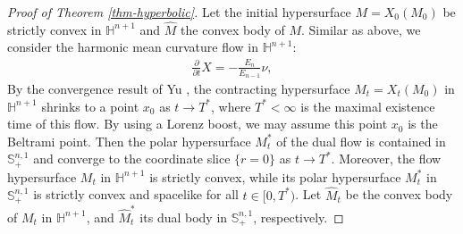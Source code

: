 \documentclass[11pt,reqno]{amsart}
\theoremstyle{definition}
\theoremstyle{remark}
\numberwithin{equation}{section}
\renewcommand{\(}{\left(}
\renewcommand{\)}{\right)}
\renewcommand{\~}{\tilde}
\renewcommand{\-}{\overline}
\newcommand{\ra}{\rightarrow}
\begin{document}
\begin{proof}[Proof of Theorem \ref{thm-hyperbolic}]
    Let the initial hypersurface $M=X_0(M_0)$ be strictly convex in $\mathbb H^{n+1}$ and $\hat{M}$ the convex body of $M$. Similar as above, we consider the harmonic mean curvature flow in $\mathbb H^{n+1}$:
    \begin{align*}
    \frac{\partial}{\partial t} X=-\frac{E_{n}}{E_{n-1}}\nu,
    \end{align*}
    By the convergence result of Yu \cite[Theorem 1.2]{Yu2016}, the contracting hypersurface $M_t=X_t(M_0)$ in $\mathbb H^{n+1}$ shrinks to a point $x_0$ as $t\ra T^\ast$, where $T^\ast<\infty$ is the maximal existence time of this flow. By using a Lorenz boost, we may assume this point $x_0$ is the Beltrami point. Then the polar hypersurface $M_t^\ast$ of the dual flow is contained in $\mathbb S^{n,1}_{+}$ and converge to the coordinate slice $\{r=0\}$ as $t\ra T^\ast$. Moreover, the flow hypersurface $M_t$ in $\mathbb H^{n+1}$ is strictly convex, while its polar hypersurface $M^\ast_t$ in $\mathbb S^{n,1}_{+}$ is strictly convex and spacelike for all $t\in [0,T^\ast)$. Let $\hat{M}_t$ be the convex body of $M_t$ in $\mathbb H^{n+1}$, and $\hat{M}_t^\ast$ its dual body in $\mathbb S^{n,1}_{+}$, respectively.
    

\end{proof}
\end{document}
